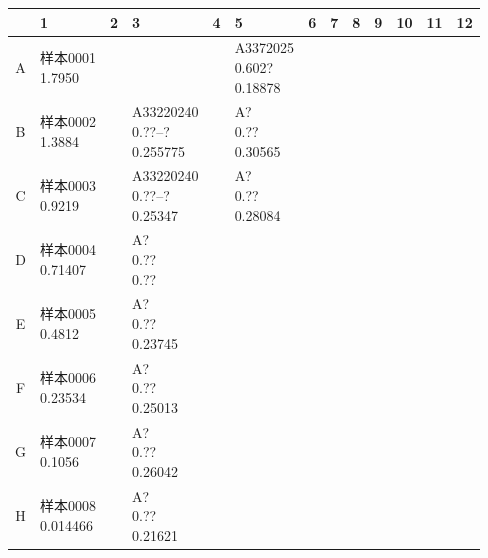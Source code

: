 \documentclass[UTF8,10pt,a4paper,fontset=fandol]{ctexart}
\begin{document}
\begin{center}
\scriptsize
\begin{tabular}{|c|p{1.05cm}|p{1.05cm}|p{1.05cm}|p{1.05cm}|p{1.05cm}|p{1.05cm}|p{1.05cm}|p{1.05cm}|p{1.05cm}|p{1.05cm}|p{1.05cm}|p{1.05cm}|}
\hline
 & 1 & 2 & 3 & 4 & 5 & 6 & 7 & 8 & 9 & 10 & 11 & 12 \\ \hline
A &
\shortstack[l]{样本0001\\1.7950} &
& & &
\shortstack[l]{A3372025\\0.602?\\0.18878} &
& & & & & & \\ \hline
B &
\shortstack[l]{样本0002\\1.3884} &
&
\shortstack[l]{A33220240\\0.??--?\\0.255775} &
&
\shortstack[l]{A?\\0.??\\0.30565} &
& & & & & & \\ \hline
C &
\shortstack[l]{样本0003\\0.9219} &
&
\shortstack[l]{A33220240\\0.??--?\\0.25347} &
&
\shortstack[l]{A?\\0.??\\0.28084} &
& & & & & & \\ \hline
D &
\shortstack[l]{样本0004\\0.71407} &
&
\shortstack[l]{A?\\0.??\\0.??} &
&
& & & & & & & \\ \hline
E &
\shortstack[l]{样本0005\\0.4812} &
&
\shortstack[l]{A?\\0.??\\0.23745} &
&
& & & & & & & \\ \hline
F &
\shortstack[l]{样本0006\\0.23534} &
&
\shortstack[l]{A?\\0.??\\0.25013} &
&
& & & & & & & \\ \hline
G &
\shortstack[l]{样本0007\\0.1056} &
&
\shortstack[l]{A?\\0.??\\0.26042} &
&
& & & & & & & \\ \hline
H &
\shortstack[l]{样本0008\\0.014466} &
&
\shortstack[l]{A?\\0.??\\0.21621} &
&
& & & & & & & \\ \hline
\end{tabular}
\end{center}
\end{document}
